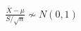 \documentclass[preview]{standalone}
\begin{document}
\begin{align*}
\frac{\bar{X} - \mu}{S / \sqrt{n}} \nsim N(0,1)
\end{align*}
\end{document}
